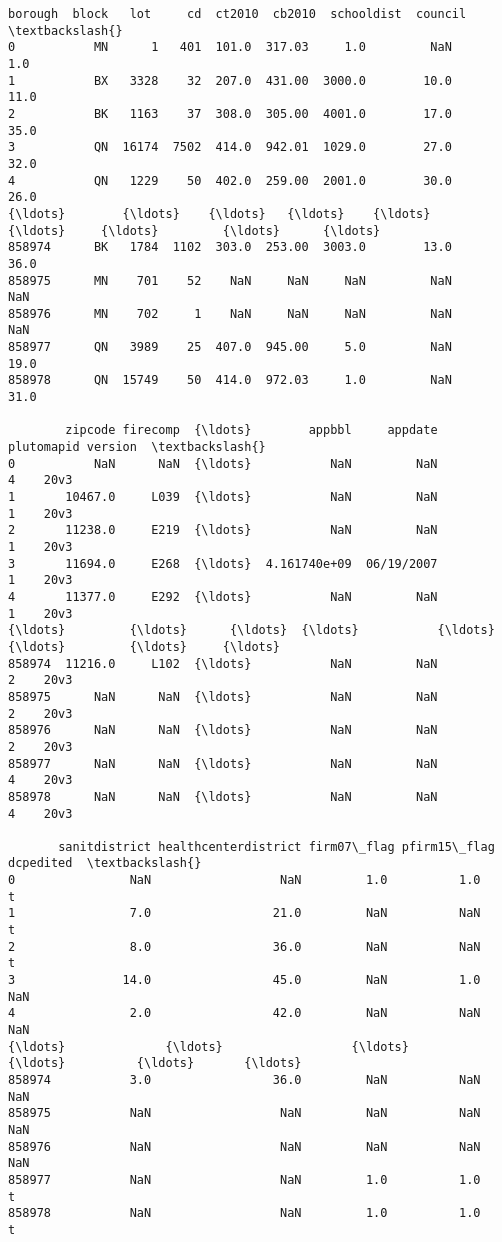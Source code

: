 \documentclass[11pt]{article}
\begin{document}
    \begin{Verbatim}[commandchars=\\\{\}]
       borough  block   lot     cd  ct2010  cb2010  schooldist  council  \textbackslash{}
0           MN      1   401  101.0  317.03     1.0         NaN      1.0
1           BX   3328    32  207.0  431.00  3000.0        10.0     11.0
2           BK   1163    37  308.0  305.00  4001.0        17.0     35.0
3           QN  16174  7502  414.0  942.01  1029.0        27.0     32.0
4           QN   1229    50  402.0  259.00  2001.0        30.0     26.0
{\ldots}        {\ldots}    {\ldots}   {\ldots}    {\ldots}     {\ldots}     {\ldots}         {\ldots}      {\ldots}
858974      BK   1784  1102  303.0  253.00  3003.0        13.0     36.0
858975      MN    701    52    NaN     NaN     NaN         NaN      NaN
858976      MN    702     1    NaN     NaN     NaN         NaN      NaN
858977      QN   3989    25  407.0  945.00     5.0         NaN     19.0
858978      QN  15749    50  414.0  972.03     1.0         NaN     31.0

        zipcode firecomp  {\ldots}        appbbl     appdate  plutomapid version  \textbackslash{}
0           NaN      NaN  {\ldots}           NaN         NaN           4    20v3
1       10467.0     L039  {\ldots}           NaN         NaN           1    20v3
2       11238.0     E219  {\ldots}           NaN         NaN           1    20v3
3       11694.0     E268  {\ldots}  4.161740e+09  06/19/2007           1    20v3
4       11377.0     E292  {\ldots}           NaN         NaN           1    20v3
{\ldots}         {\ldots}      {\ldots}  {\ldots}           {\ldots}         {\ldots}         {\ldots}     {\ldots}
858974  11216.0     L102  {\ldots}           NaN         NaN           2    20v3
858975      NaN      NaN  {\ldots}           NaN         NaN           2    20v3
858976      NaN      NaN  {\ldots}           NaN         NaN           2    20v3
858977      NaN      NaN  {\ldots}           NaN         NaN           4    20v3
858978      NaN      NaN  {\ldots}           NaN         NaN           4    20v3

       sanitdistrict healthcenterdistrict firm07\_flag pfirm15\_flag dcpedited  \textbackslash{}
0                NaN                  NaN         1.0          1.0         t
1                7.0                 21.0         NaN          NaN         t
2                8.0                 36.0         NaN          NaN         t
3               14.0                 45.0         NaN          1.0       NaN
4                2.0                 42.0         NaN          NaN       NaN
{\ldots}              {\ldots}                  {\ldots}         {\ldots}          {\ldots}       {\ldots}
858974           3.0                 36.0         NaN          NaN       NaN
858975           NaN                  NaN         NaN          NaN       NaN
858976           NaN                  NaN         NaN          NaN       NaN
858977           NaN                  NaN         1.0          1.0         t
858978           NaN                  NaN         1.0          1.0         t


\end{Verbatim}
\end{document}
